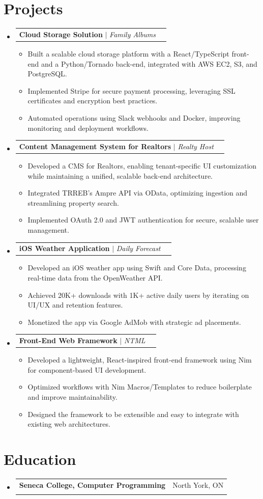 \documentclass[letterpaper,11pt]{article}
\makeatletter
\newcommand{\resumeItem}[1]{
  \item\small{#1\vspace{-2pt}}
}
\newcommand{\resumeSubheading}[4]{
  \vspace{-2pt}\item
    \begin{tabular*}{0.97\textwidth}[t]{l@{\extracolsep{\fill}}r}
      \textbf{#1} & #2 \\
      \textit{\small#3} & \textit{\small #4} \\
    \end{tabular*}\vspace{-7pt}
}
\newcommand{\resumeProjectHeading}[2]{
    \item
    \begin{tabular*}{0.97\textwidth}{l@{\extracolsep{\fill}}r}
      \small#1 & #2 \\
    \end{tabular*}\vspace{-7pt}
}
\newcommand{\resumeSubHeadingListStart}{\begin{itemize}[leftmargin=0.15in, label={}]}
\newcommand{\resumeSubHeadingListEnd}{\end{itemize}}
\newcommand{\resumeItemListStart}{\begin{itemize}}
\newcommand{\resumeItemListEnd}{\end{itemize}\vspace{-5pt}}
\makeatother
\begin{document}
\section{Projects}
  \resumeSubHeadingListStart

    \resumeProjectHeading
      {\textbf{Cloud Storage Solution} $|$ \emph{Family Albums}}{}
      \resumeItemListStart
        \resumeItem{Built a scalable cloud storage platform with a React/TypeScript front-end and a Python/Tornado back-end, integrated with AWS EC2, S3, and PostgreSQL.}
        \resumeItem{Implemented Stripe for secure payment processing, leveraging SSL certificates and encryption best practices.}
        \resumeItem{Automated operations using Slack webhooks and Docker, improving monitoring and deployment workflows.}
      \resumeItemListEnd

    \resumeProjectHeading
      {\textbf{Content Management System for Realtors} $|$ \emph{Realty Host}}{}
      \resumeItemListStart
        \resumeItem{Developed a CMS for Realtors, enabling tenant-specific UI customization while maintaining a unified, scalable back-end architecture.}
        \resumeItem{Integrated TRREB's Ampre API via OData, optimizing ingestion and streamlining property search.}
        \resumeItem{Implemented OAuth 2.0 and JWT authentication for secure, scalable user management.}
      \resumeItemListEnd

    \resumeProjectHeading
      {\textbf{iOS Weather Application} $|$ \emph{Daily Forecast}}{}
      \resumeItemListStart
        \resumeItem{Developed an iOS weather app using Swift and Core Data, processing real-time data from the OpenWeather API.}
        \resumeItem{Achieved 20K+ downloads with 1K+ active daily users by iterating on UI/UX and retention features.}
        \resumeItem{Monetized the app via Google AdMob with strategic ad placements.}
      \resumeItemListEnd

    \resumeProjectHeading
      {\textbf{Front-End Web Framework} $|$ \emph{NTML}}{}
      \resumeItemListStart
        \resumeItem{Developed a lightweight, React-inspired front-end framework using Nim for component-based UI development.}
        \resumeItem{Optimized workflows with Nim Macros/Templates to reduce boilerplate and improve maintainability.}
        \resumeItem{Designed the framework to be extensible and easy to integrate with existing web architectures.}
      \resumeItemListEnd

  \resumeSubHeadingListEnd

\section{Education}
  \resumeSubHeadingListStart
    \resumeSubheading
      {Seneca College, Computer Programming}{North York, ON}{}{}
  \resumeSubHeadingListEnd
\end{document}
